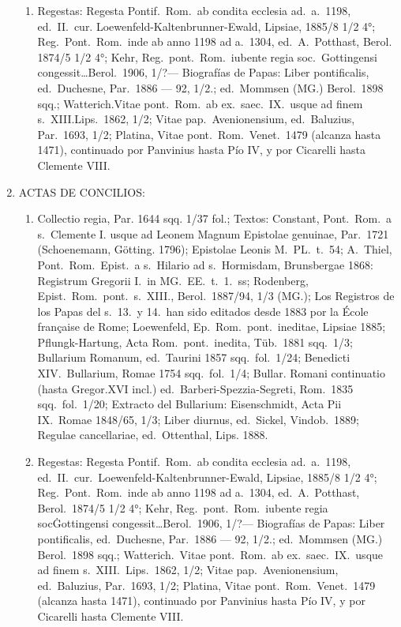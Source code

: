\raggedbottom{} \documentclass[12pt, a4paper]{book}
\begin{document}
\begin{enumerate}
\begin{enumerate}
          \item Regestas: Regesta Pontif.\ Rom.\ ab condita ecclesia ad.\ a.\ 1198, ed.\ II.\ cur. Loewenfeld-Kaltenbrunner-Ewald, Lipsiae, 1885/8 1/2 4°; Reg.\ Pont.\ Rom.\ inde ab anno 1198 ad a.\ 1304, ed.\ A.\ Potthast, Berol. 1874/5 1/2 4°; Kehr, Reg.\ pont.\ Rom.\ iubente regia soc.\ Gottingensi congessit\ldots Berol.\ 1906, 1/?— Biografías de Papas: Liber pontificalis, ed.\ Duchesne, Par.\ 1886 --- 92, 1/2.; ed.\ Mommsen (MG.) Berol.\ 1898 sqq.; Watterich.\@ Vitae pont.\ Rom.\ ab ex.\ saec.\ IX.\ usque ad finem s.\ XIII.\@ Lips.\ 1862, 1/2; Vitae pap.\ Avenionensium, ed.\ Baluzius, Par.\ 1693, 1/2; Platina, Vitae pont.\ Rom.\ Venet.\ 1479 (alcanza hasta 1471), continuado por Panvinius hasta Pío IV, y por Cicarelli hasta Clemente VIII.\@
        \end{enumerate}
  \item ACTAS DE CONCILIOS:\@  \begin{enumerate}
          \item Collectio regia, Par. 1644 sqq. 1/37 fol.; Textos: Constant, Pont.\ Rom.\ a s.\ Clemente I. usque ad Leonem Magnum Epistolae genuinae, Par.\ 1721 (Schoenemann, Götting. 1796); Epistolae Leonis M.\ PL.\ t.\ 54; A.\ Thiel, Pont.\ Rom.\ Epist.\ a s.\ Hilario ad s.\ Hormisdam, Brunsbergae 1868: Registrum Gregorii I.\ in MG.\ EE.\ t.\ 1.\ ss; Rodenberg, Epist.\ Rom.\ pont.\ s.\ XIII., Berol.\ 1887/94, 1/3 (MG.); Los Registros de los Papas del s.\ 13.\ y 14.\ han sido editados desde 1883 por la École française de Rome; Loewenfeld, Ep.\ Rom.\ pont.\ ineditae, Lipsiae 1885; Pflungk-Hartung, Acta Rom.\ pont.\ inedita, Tüb.\ 1881 sqq.\ 1/3; Bullarium Romanum, ed.\ Taurini 1857 sqq.\ fol.\ 1/24; Benedicti XIV.\ Bullarium, Romae 1754 sqq.\ fol.\ 1/4; Bullar. Romani continuatio (hasta Gregor.\@ XVI incl.) ed.\ Barberi-Spezzia-Segreti, Rom.\ 1835 sqq.\ fol.\ 1/20; Extracto del Bullarium: Eisenschmidt, Acta Pii IX.\ Romae 1848/65, 1/3; Liber diurnus, ed.\ Sickel, Vindob.\ 1889; Regulae cancellariae, ed.\ Ottenthal, Lips. 1888.
          \item Regestas: Regesta Pontif.\ Rom.\ ab condita ecclesia ad.\ a.\ 1198, ed.\ II.\ cur.\ Loewenfeld-Kaltenbrunner-Ewald, Lipsiae, 1885/8 1/2 4°; Reg.\ Pont.\ Rom.\ inde ab anno 1198 ad a.\ 1304, ed.\ A.\ Potthast, Berol.\ 1874/5 1/2 4°; Kehr, Reg.\ pont.\ Rom.\ iubente regia soc\. Gottingensi congessit\ldots Berol.\ 1906, 1/?— Biografías de Papas: Liber pontificalis, ed.\ Duchesne, Par.\ 1886 --- 92, 1/2.; ed.\ Mommsen (MG.) Berol.\ 1898 sqq.; Watterich.\ Vitae pont.\ Rom.\ ab ex.\ saec.\ IX.\ usque ad finem s.\ XIII.\ Lips.\ 1862, 1/2; Vitae pap.\ Avenionensium, ed.\ Baluzius, Par.\ 1693, 1/2; Platina, Vitae pont.\ Rom.\ Venet.\ 1479 (alcanza hasta 1471), continuado por Panvinius hasta Pío IV, y por Cicarelli hasta Clemente VIII.\

\end{enumerate}
\end{enumerate}
\end{document}
